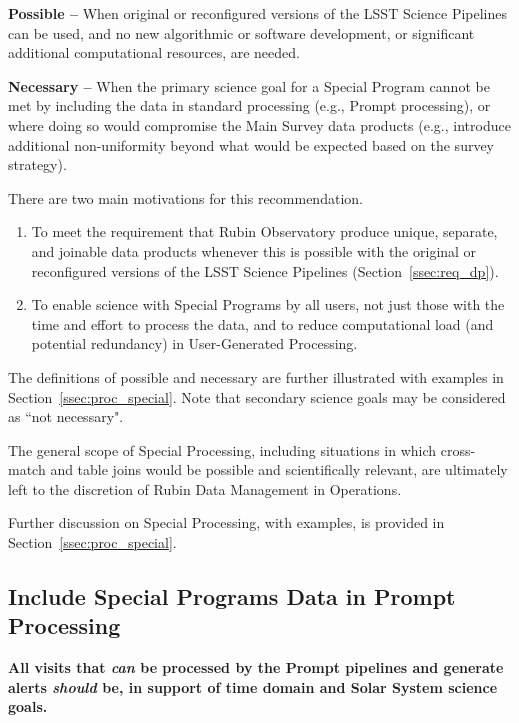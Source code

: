 \textbf{Possible -- } When original or reconfigured versions of the LSST
Science Pipelines can be used, and no new algorithmic or software development,
or significant additional computational resources, are needed.

\textbf{Necessary -- } When the primary science goal for a Special Program 
cannot be met by including the data in standard processing (e.g., Prompt processing),
or where doing so would compromise the Main Survey data products (e.g., introduce additional non-uniformity beyond what would be expected based on the survey strategy).

There are two main motivations for this recommendation.

\begin{enumerate}

\item To meet the requirement that Rubin Observatory produce
unique, separate, and joinable data products whenever this is possible 
with the original or reconfigured versions of the LSST Science Pipelines
(Section~\ref{ssec:req_dp}).

\item To enable science with Special Programs by all users, not just those
with the time and effort to process the data, and to reduce computational
load (and potential redundancy) in User-Generated Processing.

\end{enumerate}

The definitions of possible and necessary are further illustrated with examples in Section~\ref{ssec:proc_special}.
Note that secondary science goals may be considered as ``not necessary".

The general scope of Special Processing, including situations in which cross-match and table joins 
would be possible and scientifically relevant, 
are ultimately left to the discretion of Rubin Data Management in Operations.

Further discussion on Special Processing, with examples, is provided in Section~\ref{ssec:proc_special}.

\subsection{Include Special Programs Data in Prompt Processing}\label{ssec:sci_pproc}

\textbf{All visits that \emph{can} be processed by the Prompt pipelines and generate 
alerts \emph{should} be, in support of time domain and Solar System science goals.}

